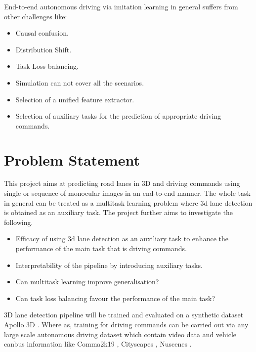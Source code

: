 End-to-end autonomous driving via imitation learning in general suffers from other challenges like: 

\begin{itemize}
\item Causal confusion.
\item Distribution Shift.
\item Task Loss balancing.
\item Simulation can not cover all the scenarios.
\item Selection of a unified feature extractor.
\item Selection of auxiliary tasks for the prediction of appropriate driving commands. 
\end{itemize}

    \section{Problem Statement}
    This project aims at predicting road lanes in 3D and driving commands using single or sequence of monocular images in an end-to-end manner. The whole task in general can be treated as a multitask learning problem where 3d lane detection is obtained as an auxiliary task. The project further aims to investigate the following.
    
    \begin{itemize}
 \item Efficacy of using 3d lane detection as an auxiliary task to enhance the performance of the main task that is driving commands.
\item Interpretability of the pipeline by introducing auxiliary tasks. 
\item Can multitask learning improve generalisation? 
\item Can task loss balancing favour the performance of the main task?  
\end{itemize}

3D lane detection pipeline will be trained and evaluated on a synthetic dataset Apollo 3D \cite{guo2020gen}. Where as, training for driving commands can be carried out via any large scale autonomous driving dataset which contain video data and vehicle canbus information like Comma2k19 \cite{1812.05752},  Cityscapes \cite{DBLP:journals/corr/CordtsORREBFRS16}, Nuscenes \cite{DBLP:journals/corr/abs-1903-11027}.

